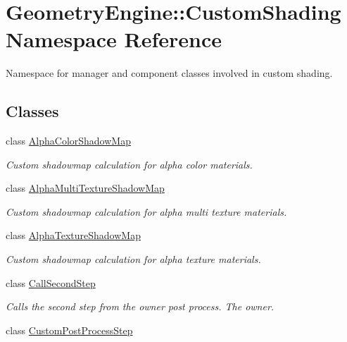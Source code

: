 \hypertarget{namespace_geometry_engine_1_1_custom_shading}{}\section{Geometry\+Engine\+::Custom\+Shading Namespace Reference}
\label{namespace_geometry_engine_1_1_custom_shading}


Namespace for manager and component classes involved in custom shading.  


\subsection*{Classes}
\begin{DoxyCompactItemize}
\item 
class \mbox{\hyperlink{class_geometry_engine_1_1_custom_shading_1_1_alpha_color_shadow_map}{Alpha\+Color\+Shadow\+Map}}
\begin{DoxyCompactList}\small\item\em Custom shadowmap calculation for alpha color materials. \end{DoxyCompactList}\item 
class \mbox{\hyperlink{class_geometry_engine_1_1_custom_shading_1_1_alpha_multi_texture_shadow_map}{Alpha\+Multi\+Texture\+Shadow\+Map}}
\begin{DoxyCompactList}\small\item\em Custom shadowmap calculation for alpha multi texture materials. \end{DoxyCompactList}\item 
class \mbox{\hyperlink{class_geometry_engine_1_1_custom_shading_1_1_alpha_texture_shadow_map}{Alpha\+Texture\+Shadow\+Map}}
\begin{DoxyCompactList}\small\item\em Custom shadowmap calculation for alpha texture materials. \end{DoxyCompactList}\item 
class \mbox{\hyperlink{class_geometry_engine_1_1_custom_shading_1_1_call_second_step}{Call\+Second\+Step}}
\begin{DoxyCompactList}\small\item\em Calls the second step from the owner post process. The owner. \end{DoxyCompactList}\item 
class \mbox{\hyperlink{class_geometry_engine_1_1_custom_shading_1_1_custom_post_process_step}{Custom\+Post\+Process\+Step}}

\end{DoxyCompactItemize}
